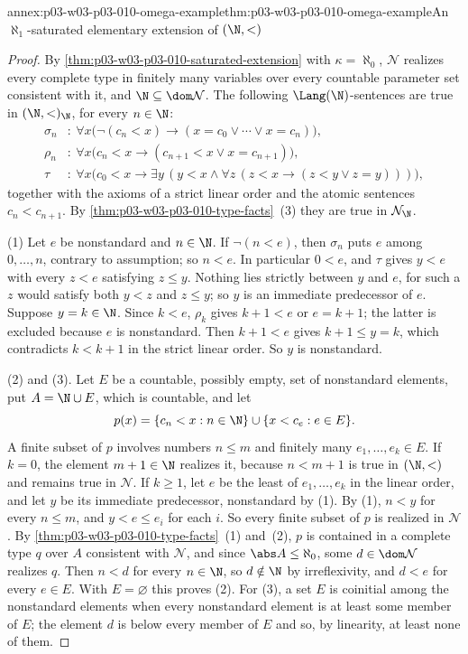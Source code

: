 \begin{annexitem}{annex:p03-w03-p03-010-omega-example}{thm:p03-w03-p03-010-omega-example}{An \(\aleph_1\)-saturated elementary extension of \((\N,<)\)}
\begin{proof}
By \cref{thm:p03-w03-p03-010-saturated-extension} with \(\kappa=\aleph_0\),
\(\mathcal N\) realizes every complete type in finitely many variables over
every countable parameter set consistent with it, and
\(\N\subseteq\dom\mathcal N\).  The following \(\Lang(\N)\)-sentences are
true in \((\N,<)_\N\), for every \(n\in\N\):
\begin{align*}
  \sigma_n&:\ \forall x\bigl(\neg(c_n<x)\to(x=c_0\lor\cdots\lor x=c_n)\bigr),\\
  \rho_n&:\ \forall x\bigl(c_n<x\to(c_{n+1}<x\lor x=c_{n+1})\bigr),\\
  \tau&:\ \forall x\bigl(c_0<x\to\exists y\,(y<x\land
        \forall z\,(z<x\to(z<y\lor z=y)))\bigr),
\end{align*}
together with the axioms of a strict linear order and the atomic sentences
\(c_n<c_{n+1}\).  By \cref{thm:p03-w03-p03-010-type-facts}~(3) they are
true in \(\mathcal N_\N\).

(1) Let \(e\) be nonstandard and \(n\in\N\).  If \(\neg(n<e)\), then
\(\sigma_n\) puts \(e\) among \(0,\ldots,n\), contrary to assumption; so
\(n<e\).  In particular \(0<e\), and \(\tau\) gives \(y<e\) with every
\(z<e\) satisfying \(z\leq y\).  Nothing lies strictly between \(y\) and
\(e\), for such a \(z\) would satisfy both \(y<z\) and \(z\leq y\); so
\(y\) is an immediate predecessor of \(e\).  Suppose \(y=k\in\N\).  Since
\(k<e\), \(\rho_k\) gives \(k+1<e\) or \(e=k+1\); the latter is excluded
because \(e\) is nonstandard.  Then \(k+1<e\) gives \(k+1\leq y=k\), which
contradicts \(k<k+1\) in the strict linear order.  So \(y\) is
nonstandard.

(2) and (3).  Let \(E\) be a countable, possibly empty, set of nonstandard
elements, put \(A=\N\cup E\), which is countable, and let
\[
  p(x)=\{c_n<x:n\in\N\}\cup\{x<c_e:e\in E\}.
\]
A finite subset of \(p\) involves numbers \(n\leq m\) and finitely many
\(e_1,\ldots,e_k\in E\).  If \(k=0\), the element \(m+1\in\N\) realizes it,
because \(n<m+1\) is true in \((\N,<)\) and remains true in \(\mathcal N\).
If \(k\geq1\), let \(e\) be the least of \(e_1,\ldots,e_k\) in the linear
order, and let \(y\) be its immediate predecessor, nonstandard by (1).  By
(1), \(n<y\) for every \(n\leq m\), and \(y<e\leq e_i\) for each \(i\).  So
every finite subset of \(p\) is realized in \(\mathcal N\).  By
\cref{thm:p03-w03-p03-010-type-facts}~(1) and~(2), \(p\) is contained in a
complete type \(q\) over \(A\) consistent with \(\mathcal N\), and since
\(\abs A\leq\aleph_0\), some \(d\in\dom\mathcal N\) realizes \(q\).  Then
\(n<d\) for every \(n\in\N\), so \(d\notin\N\) by irreflexivity, and
\(d<e\) for every \(e\in E\).  With \(E=\varnothing\) this proves (2).  For
(3), a set \(E\) is coinitial among the nonstandard elements when every
nonstandard element is at least some member of \(E\); the element \(d\) is
below every member of \(E\) and so, by linearity, at least none of them.


\end{proof}
\end{annexitem}

